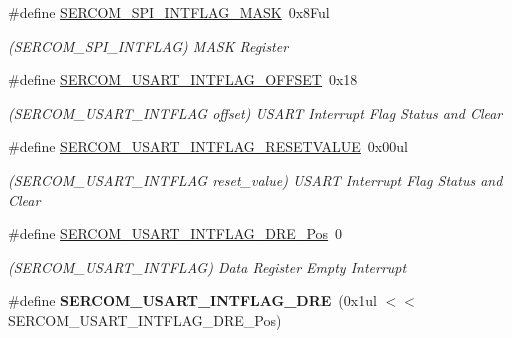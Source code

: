 \begin{DoxyCompactItemize}
\item 
\hypertarget{group___s_a_m_l21___s_e_r_c_o_m_gafd10b45ae8eecb164e36f4ea5c1d48d7}{}\#define \hyperlink{group___s_a_m_l21___s_e_r_c_o_m_gafd10b45ae8eecb164e36f4ea5c1d48d7}{S\+E\+R\+C\+O\+M\+\_\+\+S\+P\+I\+\_\+\+I\+N\+T\+F\+L\+A\+G\+\_\+\+M\+A\+S\+K}~0x8\+Ful\label{group___s_a_m_l21___s_e_r_c_o_m_gafd10b45ae8eecb164e36f4ea5c1d48d7}

\begin{DoxyCompactList}\small\item\em (S\+E\+R\+C\+O\+M\+\_\+\+S\+P\+I\+\_\+\+I\+N\+T\+F\+L\+A\+G) M\+A\+S\+K Register \end{DoxyCompactList}\item 
\hypertarget{group___s_a_m_l21___s_e_r_c_o_m_ga3c163e1c1d889e2dea4d1acede9c0f24}{}\#define \hyperlink{group___s_a_m_l21___s_e_r_c_o_m_ga3c163e1c1d889e2dea4d1acede9c0f24}{S\+E\+R\+C\+O\+M\+\_\+\+U\+S\+A\+R\+T\+\_\+\+I\+N\+T\+F\+L\+A\+G\+\_\+\+O\+F\+F\+S\+E\+T}~0x18\label{group___s_a_m_l21___s_e_r_c_o_m_ga3c163e1c1d889e2dea4d1acede9c0f24}

\begin{DoxyCompactList}\small\item\em (S\+E\+R\+C\+O\+M\+\_\+\+U\+S\+A\+R\+T\+\_\+\+I\+N\+T\+F\+L\+A\+G offset) U\+S\+A\+R\+T Interrupt Flag Status and Clear \end{DoxyCompactList}\item 
\hypertarget{group___s_a_m_l21___s_e_r_c_o_m_ga97816d20755069566c813bd11ada46e4}{}\#define \hyperlink{group___s_a_m_l21___s_e_r_c_o_m_ga97816d20755069566c813bd11ada46e4}{S\+E\+R\+C\+O\+M\+\_\+\+U\+S\+A\+R\+T\+\_\+\+I\+N\+T\+F\+L\+A\+G\+\_\+\+R\+E\+S\+E\+T\+V\+A\+L\+U\+E}~0x00ul\label{group___s_a_m_l21___s_e_r_c_o_m_ga97816d20755069566c813bd11ada46e4}

\begin{DoxyCompactList}\small\item\em (S\+E\+R\+C\+O\+M\+\_\+\+U\+S\+A\+R\+T\+\_\+\+I\+N\+T\+F\+L\+A\+G reset\+\_\+value) U\+S\+A\+R\+T Interrupt Flag Status and Clear \end{DoxyCompactList}\item 
\hypertarget{group___s_a_m_l21___s_e_r_c_o_m_ga4ee1a94fab09d978b80a90e792d2a95f}{}\#define \hyperlink{group___s_a_m_l21___s_e_r_c_o_m_ga4ee1a94fab09d978b80a90e792d2a95f}{S\+E\+R\+C\+O\+M\+\_\+\+U\+S\+A\+R\+T\+\_\+\+I\+N\+T\+F\+L\+A\+G\+\_\+\+D\+R\+E\+\_\+\+Pos}~0\label{group___s_a_m_l21___s_e_r_c_o_m_ga4ee1a94fab09d978b80a90e792d2a95f}

\begin{DoxyCompactList}\small\item\em (S\+E\+R\+C\+O\+M\+\_\+\+U\+S\+A\+R\+T\+\_\+\+I\+N\+T\+F\+L\+A\+G) Data Register Empty Interrupt \end{DoxyCompactList}\item 
\hypertarget{group___s_a_m_l21___s_e_r_c_o_m_gab5b7c73070471018c6bc0cea186b5d54}{}\#define {\bfseries S\+E\+R\+C\+O\+M\+\_\+\+U\+S\+A\+R\+T\+\_\+\+I\+N\+T\+F\+L\+A\+G\+\_\+\+D\+R\+E}~(0x1ul $<$$<$ S\+E\+R\+C\+O\+M\+\_\+\+U\+S\+A\+R\+T\+\_\+\+I\+N\+T\+F\+L\+A\+G\+\_\+\+D\+R\+E\+\_\+\+Pos)\label{group___s_a_m_l21___s_e_r_c_o_m_gab5b7c73070471018c6bc0cea186b5d54}


\end{DoxyCompactItemize}
